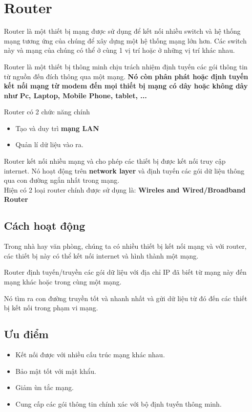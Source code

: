 \documentclass[12pt]{article}
\begin{document}
    
    \section*{Router}
    Router là một thiết bị mạng được sử dụng để kết nối nhiều switch và hệ thống
    mạng tương ứng của chúng để xây dựng một hệ thống mạng lớn hơn. Các switch này
    và mạng của chúng có thể ở cùng 1 vị trí hoặc ở những vị trí khác nhau. \

    Router là một thiết bị thông minh chịu trách nhiệm định tuyến các gói thông tin
    từ nguồn đến đích thông qua một mạng. \textbf{Nó còn phân phát hoặc định tuyến kết nối mạng
    từ modem đến mọi thiết bị mạng có dây hoặc không dây như Pc, Laptop, Mobile Phone, tablet, ... }\

    Router có 2 chức năng chính
    \begin{itemize}
        \item Tạo và duy trì \textbf{mạng LAN}
        \item Quản lí dữ liệu vào ra.
    \end{itemize}

    Router kết nối nhiều mạng và cho phép các thiết bị được kết nối truy cập internet. Nó hoạt động
    trên \textbf{network layer} và định tuyến các gói dữ liệu thông qua con đường
    ngắn nhất trong mạng.\\

    Hiện có 2 loại router chính được sử dụng là: \textbf{Wireles and Wired/Broadband Router}

    \subsection*{Cách hoạt động}
    Trong nhà hay văn phòng, chúng ta có nhiều thiết bị kết nối mạng và với router, các thiết
    bị này có thể kết nối internet và hình thành một mạng. \

    Router định tuyến/truyền các gói dữ liệu với địa chỉ IP đã biết từ mạng này 
    đến mạng khác hoặc trong cùng một mạng. \

    Nó tìm ra con đường truyền tốt và nhanh nhất và gửi dữ liệu từ đó đến các thiết
    bị kết nối trong phạm vi mạng. \
    
    \subsection*{Ưu điểm}
    \begin{itemize}
        \item Kết nối được với nhiều cấu trúc mạng khác nhau.
        \item Bảo mật tốt với mật khẩu.
        \item Giảm ùn tắc mạng.
        \item Cung cấp các gói thông tin chính xác với bộ định tuyến thông minh.
    \end{itemize}
\end{document}
